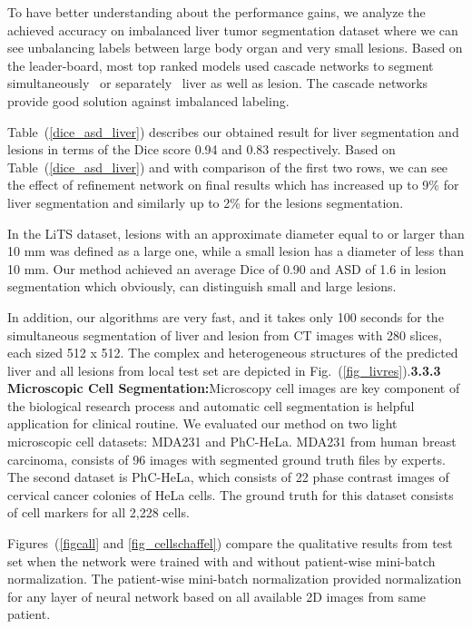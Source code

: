 \documentclass[10pt,twocolumn,letterpaper]{article}
\begin{document}
To have better understanding about the performance gains, we analyze the achieved accuracy on imbalanced liver tumor segmentation dataset where we can see unbalancing labels between large body organ and very small lesions.
Based on the leader-board, most top ranked models used cascade networks to segment simultaneously~\cite{Han17a} or separately~\cite{BiKKF17, VorontsovCTPK17} liver as well as lesion.
The cascade networks provide good solution against imbalanced labeling.

Table~(\ref{dice_asd_liver}) describes our obtained result for liver segmentation and lesions in terms of the Dice score 0.94 and 0.83 respectively.
Based on Table~(\ref{dice_asd_liver}) and with comparison of the first two rows, we can see the effect of refinement network on final results which has increased up to 9\% for liver segmentation and similarly up to 2\% for the lesions segmentation.

In the LiTS dataset, lesions with an approximate diameter equal to or larger than 10 mm was defined as a large one, while a small lesion has a diameter of less than 10 mm.
Our method achieved an average Dice of 0.90 and ASD of 1.6 in lesion segmentation which obviously, can distinguish small and large lesions. %

In addition, our algorithms are very fast, and it takes only 100 seconds for the simultaneous segmentation of liver and lesion from CT images with 280 slices, each sized 512 x 512.
The complex and heterogeneous structures of the predicted liver and all lesions from local test set are depicted in Fig.~(\ref{fig_livres}).\textbf{3.3.3 Microscopic Cell Segmentation:}Microscopy cell images are key component of the biological research process and automatic cell segmentation is helpful application for clinical routine. We evaluated our method on two light microscopic cell datasets: MDA231 and PhC-HeLa.
MDA231 from human breast carcinoma, consists of 96 images with segmented ground truth files by experts.
The second dataset is PhC-HeLa, which consists of 22 phase contrast images of cervical cancer colonies of HeLa cells. The ground truth for this dataset consists of cell markers for all 2,228 cells.

Figures~(\ref{figcall} and \ref{fig_cellschaffel}) compare the qualitative results from test set when the network were trained with and without patient-wise mini-batch normalization. The patient-wise mini-batch normalization provided normalization for any layer of neural network based on all available 2D images from same patient.%
\end{document}
